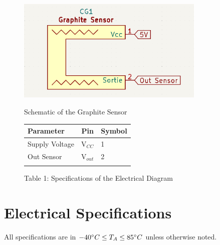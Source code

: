 \documentclass[10pt]{datasheet}
\begin{document}
\begin{figure}[h!]
    \begin{minipage}[ts]{.47\linewidth}
        \centering
        \captionsetup{justification=centering}
        \includegraphics[width=0.8\textwidth]{Cover/ElectricDiagramSensor.png}
        \caption{\small{Schematic of the Graphite Sensor}}
    \end{minipage}
    \begin{minipage}[b]{.45\linewidth}
        \centering
        \caption*{Table 1: Specifications of the Electrical Diagram}
            \begin{tabularx}{\textwidth}{l | c | X}
                \thickhline
                \textbf{Parameter} & \textbf{Pin} & \textbf{Symbol} \\
                \hline
                Supply Voltage & V$_{CC}$ & 1 \\ 
                \hline
                Out Sensor & V$_{out}$ & 2 \\
                \thickhline
            \end{tabularx}
    \end{minipage}
\end{figure}

\setcounter{table}{1}

\section{Electrical Specifications}
All specifications are in $-40\degree C \leq T_A \leq 85\degree C$ unless otherwise noted.
\end{document}
